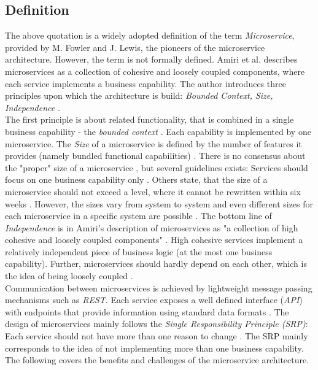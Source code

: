 \subsection{Definition}
The above quotation is a widely adopted definition of the term \textit{Microservice}, provided by M. Fowler and J. Lewis, the pioneers of the microservice architecture. However, the term is not formally defined. Amiri et al. describes microservices as a collection of cohesive and loosely coupled components, where each service implements a business capability.
 The author introduces three principles upon which the architecture is build: \textit{Bounded Context, Size, Independence} \cite{ObjectAwareAmiri}. \\
 The first principle is about related functionality, that is combined in a single business capability - the  \textit{bounded context} \cite{FunctionalDecompositionHeinrich}. Each capability is implemented by one microservice. 
The \textit{Size} of a microservice is defined by the number of features it provides (namely bundled functional capabilities)  \cite{WorkloadbasedClustering}. There is no consensus about the "proper" size of a microservice \cite{DomainEngineeringMunezero}, but several guidelines exists: Services should focus on one business capability only \cite{ObjectAwareAmiri}. Others state, that the size of a microservice should not exceed a level, where it cannot be rewritten within six weeks \cite{WorkloadbasedClustering}. However, the sizes vary from system to system \cite{FunctionalDecompositionHeinrich} and even different sizes for each microservice in a specific system are possible \cite{DomainEngineeringMunezero}. The bottom line of \textit{Independence} is in Amiri's description of microservices as "a collection of high cohesive and loosely coupled components" \cite{ObjectAwareAmiri}. High cohesive services implement a relatively independent piece of business logic (at the most one business capability). Further, microservices should hardly depend on each other, which is the idea of being loosely coupled \cite{DataflowDrivenChen}.
\\
Communication between microservices is achieved by lightweight message passing mechanisms such as \textit{REST}. Each service exposes a well defined interface (\textit{API}) with endpoints that provide information using standard data formats \cite{FunctionalDecompositionHeinrich}. 
The design of microservices mainly follows the \textit{Single Responsibility Principle (SRP)}: Each service should not have more than one reason to change \cite{TowardsUnderstandingEvolution}. The SRP mainly corresponds to the idea of not implementing more than one business capability.
The following covers the benefits and challenges of the microservice architecture.

